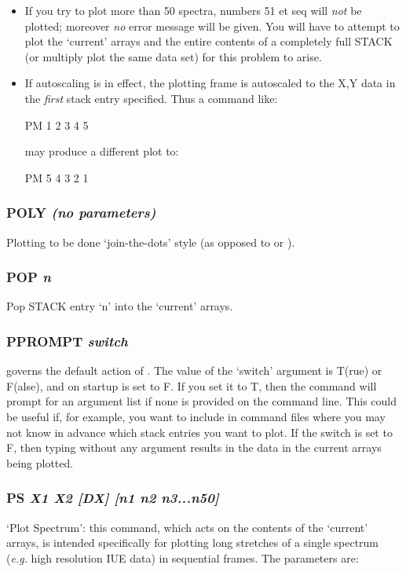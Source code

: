 \documentclass[twoside,11pt,noabs,nolof]{starlink}
\providecommand{\dipcom}[3]{\subsubsection*{\label{COM:#1}\textbf{#1} \emph{#2}}}
\begin{document}
\begin{itemize}

\item If you try to plot more than 50 spectra, numbers 51 et seq will
\emph{not} be plotted; moreover \emph{no} error message will be given.
You will have to attempt to plot the `current' arrays and the entire
contents of a completely full STACK (or multiply plot the same
data set) for this problem to arise.

\item If autoscaling is in effect, the plotting frame is autoscaled to
the X,Y data in the \emph{first} stack entry specified. Thus a command
like:

\begin{terminalv}
PM 1 2 3 4 5
\end{terminalv}

may produce a different plot to:

\begin{terminalv}
PM 5 4 3 2 1
\end{terminalv}

\end{itemize}

\dipcom{POLY}{(no parameters)}{Causes plots to be done 'join-the-dots' style}
Plotting to be done `join-the-dots' style (as opposed to   or ).

\dipcom{POP}{n}{Pops a stack entry into the current arrays}
Pop STACK entry `n' into the `current' arrays.

\dipcom{PPROMPT}{switch}{Controls which prompts are issued by {\texttt{PM}}}
  governs the default action of .  The value of the `switch'
argument is T(rue) or F(alse), and on startup is set to F. If you set
it to T, then the   command will prompt for an argument list if none
is provided on the command line. This could be useful if, for example,
you want to include   in command files where you may not know in
advance which stack entries you want to plot. If the switch is set to
F, then typing   without any argument results in the data in the
current arrays being plotted.

\dipcom{PS}{X1 X2 [DX] [n1 n2 n3...n50]}{Plots long stretches from a single spectrum}
`Plot Spectrum': this command, which acts on the contents of the
`current' arrays, is intended specifically for plotting long stretches
of a single spectrum (\emph{e.g.} high resolution IUE data) in
sequential frames. The parameters are:
\end{document}
